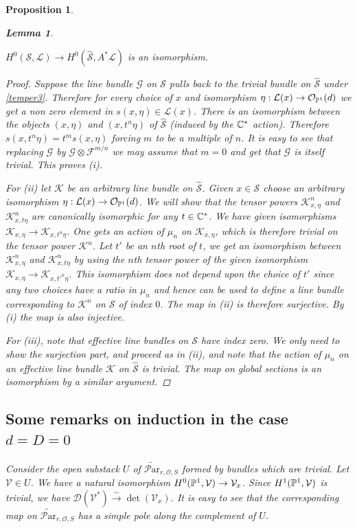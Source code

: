 \documentclass[11pt]{amsart}
\newcommand\mf{\mathcal{F}}
\newcommand\mk{\mathcal{K}}
\newcommand\pone{\Bbb{P}^1}
\newcommand\mv{\mathcal{V}}
\newcommand\tensor{\otimes}
\newcommand\ml{\mathcal{L}}
\newcommand\mg{\mathcal{G}}
\newcommand\ms{\mathcal{S}}
\newcommand\Par{\mathcal{P}\text{ar} }
\newcommand{\leto}[1]{\stackrel{#1}{\to}}
\newtheorem{proposition}[theorem]{Proposition}
\newtheorem{lemma}[theorem]{Lemma}
\numberwithin{theorem}{subsection}
\begin{document}
{\begin{proposition}
\begin{lemma}
\begin{enumerate}
$H^0({\ms},\ml)\to H^0(\widehat{\ms},A^*\ml)$ is an isomorphism.
\end{enumerate}
\end{lemma}
\begin{proof}
Suppose the line bundle $\mg$ on ${\ms}$ pulls back  to the trivial bundle on $\widehat{\ms}$ under \eqref{temper3}. Therefore for every choice of $x$ and isomorphism $\eta:\ml(x)\to \mathcal{O}_{\Bbb{P}^1}(d)$
we get a non zero element in $s(x,\eta)\in\ml(x)$.
There is an isomorphism between the  objects $(x,\eta)$ and $(x,t^n\eta)$ of $\widehat{\ms}$ (induced by the $\Bbb{C}^*$ action). Therefore $s(x,t^n\eta)=t^m s(x,\eta)$ forcing $m$ to be a multiple of $n$. It is easy to see that replacing $\mg$ by $\mg\tensor\mf^{m/n}$ we  may assume that $m=0$ and get that $\mg$ is itself trivial. This proves (i).

For (ii) let $\mk$ be an arbitrary line bundle on $\widehat{\ms}$. Given $x\in\ms$ choose an arbitrary isomorphism $\eta:\ml(x)\to \mathcal{O}_{\Bbb{P}^1}(d)$. We will show that the tensor powers $\mk^n_{x,\eta}$ and $\mk^n_{x,t\eta}$ are canonically isomorphic for any $t\in \Bbb{C}^*$. We have given isomorphisms
$\mk_{x,\eta}\to \mk_{x,t^n\eta}$. One gets an action of $\mu_n$ on $\mk_{x,\eta}$, which is therefore
trivial on the tensor power $\mk^n$. Let $t'$ be an $n$th root of $t$, we get an isomorphism between $\mk^n_{x,\eta}$ and $\mk^n_{x,t\eta}$ by using the $n$th tensor power of the given isomorphism $\mk_{x,\eta}\to \mk_{x,t'^n\eta}$. This isomorphism does not depend upon the choice of $t'$  since any two choices have a ratio in $\mu_n$ and hence can be used to define a line bundle corresponding to $\mk^n$ on ${\ms}$ of index $0$. The map in (ii) is therefore surjective. By (i) the map is also injective.

For (iii), note that effective line bundles on ${\ms}$ have index zero. We only need to show the surjection part, and proceed as in (ii), and note that the action of $\mu_n$ on an effective line bundle $\mk$ on $\widehat{\ms}$ is trivial. The map on global sections is an isomorphism by a similar argument.
\end{proof}
\subsection{Some remarks on induction in the case $d=D=0$}
Consider the open substack $U$ of $\widetilde{\Par}_{r,\mathcal{O},S}$ formed by bundles which are trivial. Let $\mv\in U$. We have a natural
isomorphism $H^0(\pone,\mv)\to\mv_x$. Since $H^1(\pone,\mv)$ is trivial, we have $\mathcal{D}(\mv^*)\leto\sim \det(\mv_x)$. It is easy to see that the corresponding map on $\widetilde{\Par}_{r,\mathcal{O},S}$ has a simple pole along the complement of $U$.


\end{proposition}}
\end{document}
